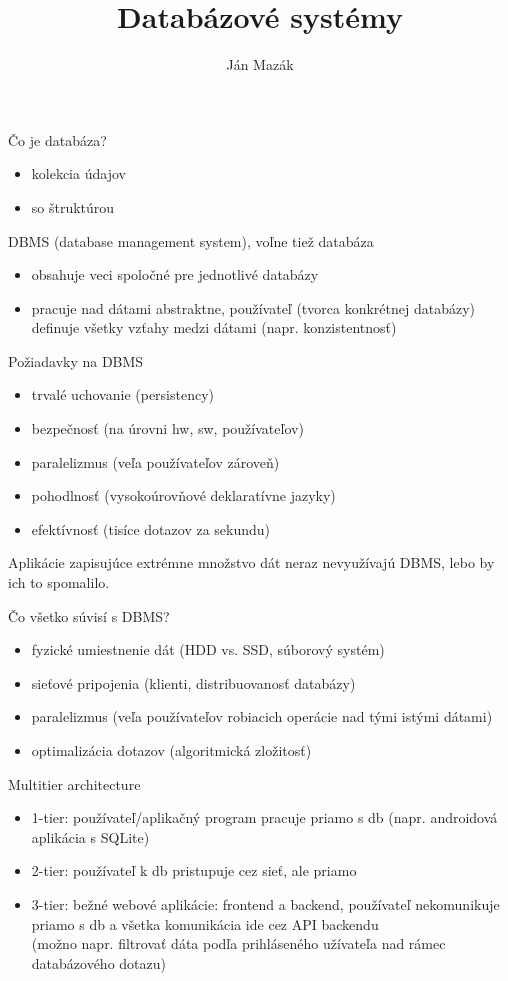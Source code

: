 \documentclass[12pt]{beamer}
\title{Databázové systémy}
\author{Ján Mazák}
\institute{FMFI UK Bratislava}
\date{}
\begin{document}
\frame{\titlepage}

\begin{frame}{Čo je databáza?}
\begin{itemize}
\item kolekcia údajov
\item so štruktúrou
\end{itemize}
\vskip 1cm
\pause

DBMS (database management system), voľne tiež databáza
\begin{itemize}
\item obsahuje veci spoločné pre jednotlivé databázy
\item pracuje nad dátami abstraktne, používateľ (tvorca konkrétnej databázy) definuje všetky vzťahy medzi dátami (napr. konzistentnosť)
\end{itemize}
\end{frame}

\begin{frame}{Požiadavky na DBMS}
\begin{itemize}
\item trvalé uchovanie (persistency)
\item bezpečnosť (na úrovni hw, sw, používateľov)
\item paralelizmus (veľa používateľov zároveň)
\item pohodlnosť (vysokoúrovňové deklaratívne jazyky)
\item efektívnosť (tisíce dotazov za sekundu)
\end{itemize}
\bigskip
\pause
Aplikácie zapisujúce extrémne množstvo dát neraz nevyužívajú DBMS, lebo by ich to spomalilo.
\end{frame}

\begin{frame}{Čo všetko súvisí s DBMS?}
\begin{itemize}
\item fyzické umiestnenie dát (HDD vs. SSD, súborový systém)
\item sieťové pripojenia (klienti, distribuovanosť databázy)
\item paralelizmus (veľa používateľov robiacich operácie nad tými istými dátami)
\item optimalizácia dotazov (algoritmická zložitosť)
\end{itemize}
\end{frame}

\begin{frame}{Multitier architecture}
\begin{itemize}
\item 1-tier: používateľ/aplikačný program pracuje priamo s db (napr. androidová aplikácia s SQLite)
\item 2-tier: používateľ k db pristupuje cez sieť, ale priamo
\pause
\item 3-tier: bežné webové aplikácie: frontend a backend, používateľ nekomunikuje priamo s db a všetka komunikácia ide cez API backendu\\
	(možno napr. filtrovať dáta podľa prihláseného užívateľa nad rámec databázového dotazu)
\end{itemize}
\end{frame}
\end{document}
